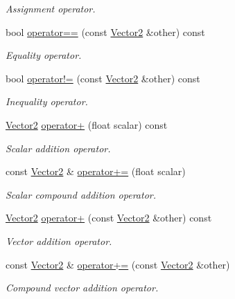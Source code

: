 \begin{DoxyCompactItemize}
\begin{DoxyCompactList}\small\item\em Assignment operator. \end{DoxyCompactList}\item 
bool \hyperlink{classchaos_1_1gfx_1_1_vector2_aee957f369c27fd28b8f387e13c4fb085}{operator==} (const \hyperlink{classchaos_1_1gfx_1_1_vector2}{Vector2} \&other) const 
\begin{DoxyCompactList}\small\item\em Equality operator. \end{DoxyCompactList}\item 
bool \hyperlink{classchaos_1_1gfx_1_1_vector2_ab90c48bca7d89e8594b3eef0571c7824}{operator!=} (const \hyperlink{classchaos_1_1gfx_1_1_vector2}{Vector2} \&other) const 
\begin{DoxyCompactList}\small\item\em Inequality operator. \end{DoxyCompactList}\item 
\hyperlink{classchaos_1_1gfx_1_1_vector2}{Vector2} \hyperlink{classchaos_1_1gfx_1_1_vector2_a4e28157ab025cdc32da4017758bef4ff}{operator+} (float scalar) const 
\begin{DoxyCompactList}\small\item\em Scalar addition operator. \end{DoxyCompactList}\item 
const \hyperlink{classchaos_1_1gfx_1_1_vector2}{Vector2} \& \hyperlink{classchaos_1_1gfx_1_1_vector2_a4405ead202e4cb2c4a229afa0d412356}{operator+=} (float scalar)
\begin{DoxyCompactList}\small\item\em Scalar compound addition operator. \end{DoxyCompactList}\item 
\hyperlink{classchaos_1_1gfx_1_1_vector2}{Vector2} \hyperlink{classchaos_1_1gfx_1_1_vector2_a52eb8f6053de6ae27773d42763ab2107}{operator+} (const \hyperlink{classchaos_1_1gfx_1_1_vector2}{Vector2} \&other) const 
\begin{DoxyCompactList}\small\item\em Vector addition operator. \end{DoxyCompactList}\item 
const \hyperlink{classchaos_1_1gfx_1_1_vector2}{Vector2} \& \hyperlink{classchaos_1_1gfx_1_1_vector2_a5b0e2d630e9de9c0ec5c856250ec3d78}{operator+=} (const \hyperlink{classchaos_1_1gfx_1_1_vector2}{Vector2} \&other)
\begin{DoxyCompactList}\small\item\em Compound vector addition operator. \end{DoxyCompactList}\end{DoxyCompactItemize}
